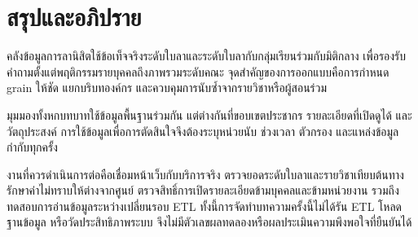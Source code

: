 \section{สรุปและอภิปราย}
คลังข้อมูลการลานิสิตใช้ข้อเท็จจริงระดับใบลาและระดับใบลากับกลุ่มเรียนร่วมกับมิติกลาง เพื่อรองรับคำถามตั้งแต่พฤติกรรมรายบุคคลถึงภาพรวมระดับคณะ จุดสำคัญของการออกแบบคือการกำหนด grain ให้ชัด แยกบริบทองค์กร และควบคุมการนับซ้ำจากรายวิชาหรือผู้สอนร่วม

มุมมองทั้งหกบทบาทใช้ข้อมูลพื้นฐานร่วมกัน แต่ต่างกันที่ขอบเขตประชากร รายละเอียดที่เปิดดูได้ และวัตถุประสงค์ การใช้ข้อมูลเพื่อการตัดสินใจจึงต้องระบุหน่วยนับ ช่วงเวลา ตัวกรอง และแหล่งข้อมูลกำกับทุกครั้ง

งานที่ควรดำเนินการต่อคือเชื่อมหน้าเว็บกับบริการจริง ตรวจยอดระดับใบลาและรายวิชาเทียบต้นทาง รักษาค่าไม่ทราบให้ต่างจากศูนย์ ตรวจสิทธิ์การเปิดรายละเอียดข้ามบุคคลและข้ามหน่วยงาน รวมถึงทดสอบการอ่านข้อมูลระหว่างเปลี่ยนรอบ ETL ทั้งนี้การจัดทำบทความครั้งนี้ไม่ได้รัน ETL โหลดฐานข้อมูล หรือวัดประสิทธิภาพระบบ จึงไม่มีตัวเลขผลทดลองหรือผลประเมินความพึงพอใจที่ยืนยันได้

